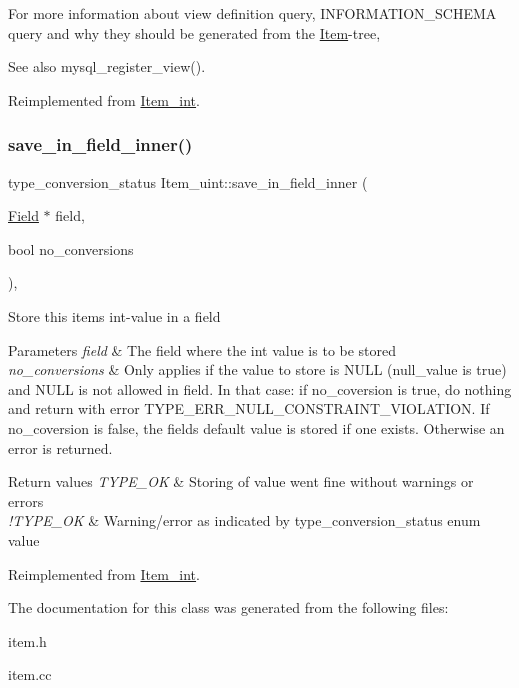 For more information about view definition query, I\+N\+F\+O\+R\+M\+A\+T\+I\+O\+N\+\_\+\+S\+C\+H\+E\+MA query and why they should be generated from the \mbox{\hyperlink{classItem}{Item}}-\/tree, \begin{DoxySeeAlso}{See also}
mysql\+\_\+register\+\_\+view(). 
\end{DoxySeeAlso}


Reimplemented from \mbox{\hyperlink{classItem__int_a7c2f1ba97b34b9b3379d49e85d81bdc0}{Item\+\_\+int}}.

\mbox{\label{classItem__uint_a91382bc23286fc3fcd9fdab10dce8567}} 
\subsubsection{\texorpdfstring{save\+\_\+in\+\_\+field\+\_\+inner()}{save\_in\_field\_inner()}}
{\footnotesize\ttfamily type\+\_\+conversion\+\_\+status Item\+\_\+uint\+::save\+\_\+in\+\_\+field\+\_\+inner (\begin{DoxyParamCaption}\item[{\mbox{\hyperlink{classField}{Field}} $\ast$}]{field,  }\item[{bool}]{no\+\_\+conversions }\end{DoxyParamCaption})\hspace{0.3cm}{\ttfamily [protected]}, {\ttfamily [virtual]}}

Store this item\textquotesingle{}s int-\/value in a field


\begin{DoxyParams}{Parameters}
{\em field} & The field where the int value is to be stored \\
\hline
{\em no\+\_\+conversions} & Only applies if the value to store is N\+U\+LL (null\+\_\+value is true) and N\+U\+LL is not allowed in field. In that case\+: if no\+\_\+coversion is true, do nothing and return with error T\+Y\+P\+E\+\_\+\+E\+R\+R\+\_\+\+N\+U\+L\+L\+\_\+\+C\+O\+N\+S\+T\+R\+A\+I\+N\+T\+\_\+\+V\+I\+O\+L\+A\+T\+I\+ON. If no\+\_\+coversion is false, the field\textquotesingle{}s default value is stored if one exists. Otherwise an error is returned.\\
\hline
\end{DoxyParams}

\begin{DoxyRetVals}{Return values}
{\em T\+Y\+P\+E\+\_\+\+OK} & Storing of value went fine without warnings or errors \\
\hline
{\em !\+T\+Y\+P\+E\+\_\+\+OK} & Warning/error as indicated by type\+\_\+conversion\+\_\+status enum value \\
\hline
\end{DoxyRetVals}


Reimplemented from \mbox{\hyperlink{classItem__int_a61fc7a6461f8d3f027fc91b5aeca8d1b}{Item\+\_\+int}}.



The documentation for this class was generated from the following files\+:\begin{DoxyCompactItemize}
\item 
item.\+h\item 
item.\+cc\end{DoxyCompactItemize}
